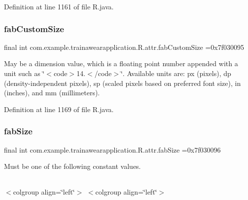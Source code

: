 Definition at line 1161 of file R.\+java.

\mbox{\label{classcom_1_1example_1_1trainawearapplication_1_1_r_1_1attr_a54c6c255d4ea8f5356c3c9e4a0034862}} 
\subsubsection{\texorpdfstring{fabCustomSize}{fabCustomSize}}
{\footnotesize\ttfamily final int com.\+example.\+trainawearapplication.\+R.\+attr.\+fab\+Custom\+Size =0x7f030095\hspace{0.3cm}{\ttfamily [static]}}

May be a dimension value, which is a floating point number appended with a unit such as \char`\"{}$<$code$>$14.\+5sp$<$/code$>$\char`\"{}. Available units are\+: px (pixels), dp (density-\/independent pixels), sp (scaled pixels based on preferred font size), in (inches), and mm (millimeters). 

Definition at line 1169 of file R.\+java.

\mbox{\label{classcom_1_1example_1_1trainawearapplication_1_1_r_1_1attr_a47846f87b8fa0180003303271c161d83}} 
\subsubsection{\texorpdfstring{fabSize}{fabSize}}
{\footnotesize\ttfamily final int com.\+example.\+trainawearapplication.\+R.\+attr.\+fab\+Size =0x7f030096\hspace{0.3cm}{\ttfamily [static]}}

Must be one of the following constant values.

\tabulinesep=1mm
\begin{longtabu}spread 0pt [c]{*{0}{|X[-1]}|}
\hline
\end{longtabu}
$<$colgroup align=\char`\"{}left\char`\"{}$>$ $<$colgroup align=\char`\"{}left\char`\"{}$>$ 

